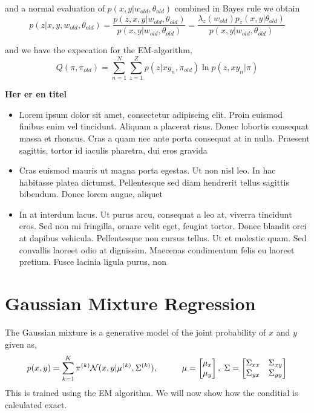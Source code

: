 and a normal evaluation of $p(x,y|w_{old}, \theta_{old})$
combined in Bayes rule we obtain
$$p(z|x,y,w_{old},\theta_{old}) = \frac{p(z,x,y|w_{old},\theta_{old})}{p(x,y|w_{old}, \theta_{old})} =
 \frac{\lambda_z(w_{old})p_z(x,y|\theta_{old})}{p(x,y|w_{old}, \theta_{old})} $$

and we have the expecation for the EM-algorithm, 
$$Q(\pi, \pi_{old}) = \sum_{n=1}^N \sum_{z=1}^Z p(z|xy_n, \pi_{old}) \ln p(z,xy_n|\pi)$$

\begin{tcolorbox}[
    sharp corners,
    boxrule=0mm,
    enhanced,
    borderline west={2pt}{0pt}{red},
    colframe=drGray,
    colback=drGray,
    coltitle=black,
]
{\large \textbf{Her er en titel}}
\begin{itemize}
    \item Lorem ipsum dolor sit amet, consectetur adipiscing elit. Proin euismod finibus enim vel tincidunt. Aliquam a placerat risus. Donec lobortis consequat massa et rhoncus. Cras a quam nec ante porta consequat at in nulla. Praesent sagittis, tortor id iaculis pharetra, dui eros gravida 

\item Cras euismod mauris ut magna porta egestas. Ut non nisl leo. In hac habitasse platea dictumst. Pellentesque sed diam hendrerit tellus sagittis bibendum. Donec lorem augue, aliquet 

 \item In at interdum lacus. Ut purus arcu, consequat a leo at, viverra tincidunt eros. Sed non mi fringilla, ornare velit eget, feugiat tortor. Donec blandit orci at dapibus vehicula. Pellentesque non cursus tellus. Ut et molestie quam. Sed convallis laoreet odio at dignissim. Maecenas condimentum felis eu laoreet pretium. Fusce lacinia ligula purus, non
\end{itemize}
\end{tcolorbox}

\section{Gaussian Mixture Regression}
The Gaussian mixture is a generative model of the joint probability of $x$ and $y$ given as, 
$$p(x,y)= \sum_{k=1}^K \pi^{(k)} \mathcal{N}(x,y|\mu^{(k)},\Sigma^{(k)}), 
\hspace{1cm} \mu=\begin{bmatrix}
    \mu_x \\ \mu_y
\end{bmatrix},\hspace{0.1cm} \Sigma = \begin{bmatrix}
    \Sigma_{xx} & \Sigma_{xy}\\ \Sigma_{yx}& \Sigma_{yy}
\end{bmatrix}$$
This is trained using the EM algorithm. We will now show how the conditial is
calculated exact. 
